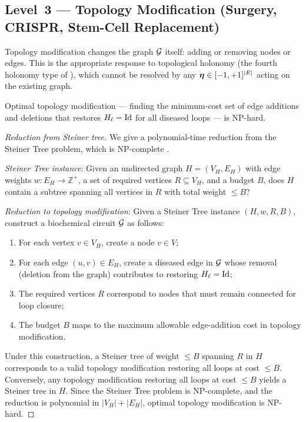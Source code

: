 \subsection{Level~3 — Topology Modification (Surgery, CRISPR, Stem-Cell Replacement)}
\label{sec:level3}

Topology modification changes the graph $\mathcal{G}$ itself: adding or removing
nodes or edges.  This is the appropriate response to topological holonomy
(the fourth holonomy type of ), which cannot be
resolved by any $\boldsymbol{\eta} \in [-1,+1]^{|E|}$ acting on the existing graph.

\begin{proposition}
\label{prop:level3-nphard}
Optimal topology modification — finding the minimum-cost set of edge additions
and deletions that restores $H_\ell = \mathrm{Id}$ for all diseased loops — is
NP-hard.
\end{proposition}

\begin{proof}[Reduction from Steiner tree]
We give a polynomial-time reduction from the Steiner Tree problem, which is
NP-complete \citep{Karp1972}.

\textit{Steiner Tree instance}: Given an undirected graph $H = (V_H, E_H)$
with edge weights $w : E_H \to \mathbb{Z}^+$, a set of required vertices
$R \subseteq V_H$, and a budget $B$, does $H$ contain a subtree spanning all
vertices in $R$ with total weight $\leq B$?

\textit{Reduction to topology modification}: Given a Steiner Tree instance
$(H, w, R, B)$, construct a biochemical circuit $\mathcal{G}$ as follows:
\begin{enumerate}[label=(\alph*), leftmargin=2em]
  \item For each vertex $v \in V_H$, create a node $v \in V$;
  \item For each edge $(u,v) \in E_H$, create a diseased edge in $\mathcal{G}$
    whose removal (deletion from the graph) contributes to restoring
    $H_\ell = \mathrm{Id}$;
  \item The required vertices $R$ correspond to nodes that must remain
    connected for loop closure;
  \item The budget $B$ maps to the maximum allowable edge-addition cost in
    topology modification.
\end{enumerate}
Under this construction, a Steiner tree of weight $\leq B$ spanning $R$
in $H$ corresponds to a valid topology modification restoring all loops at
cost $\leq B$.  Conversely, any topology modification restoring all loops
at cost $\leq B$ yields a Steiner tree in $H$.  Since the Steiner Tree
problem is NP-complete, and the reduction is polynomial in $|V_H| + |E_H|$,
optimal topology modification is NP-hard.
\end{proof}

